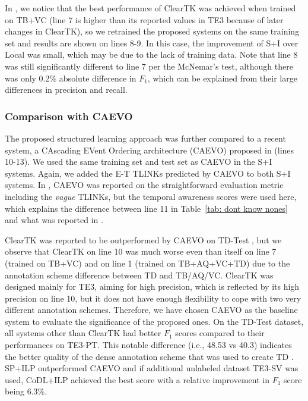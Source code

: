 \documentclass[11pt,letterpaper]{article}
\newcommand{\final}[1]{#1}
\begin{document}
{In \citet{uzzaman2013TE3}, we notice that the best performance of ClearTK was achieved when trained on TB+VC (line 7 is higher than its reported values in TE3 because of later changes in ClearTK), so we retrained the proposed systems on the same training set and results are shown on lines 8-9.
In this case, the improvement of S+I over Local was small, which may be due to the lack of training data. Note that line 8 was still significantly different to line 7 per the McNemar's test, although there was only 0.2\% absolute difference in $F_1$, which can be explained from their large differences in precision and recall.

\subsubsection{\final{Comparison with CAEVO}}
The proposed structured learning approach was further compared to a recent system, a CAscading EVent Ordering architecture (CAEVO) proposed in \citet{chambers2014dense} (lines 10-13).
We used the same training set and test set as CAEVO in the S+I systems. Again, we added the E-T TLINKs predicted by CAEVO to both S+I systems.
In \citet{chambers2014dense}, CAEVO was reported on the straightforward evaluation metric including the {\em vague} TLINKs, but the temporal awareness scores were used here, which explains the difference between line 11 \final{in Table~\ref{tab: dont know nones}} and \final{what was reported in} \citet{chambers2014dense}.

ClearTK was reported to be outperformed by CAEVO on TD-Test \citep{chambers2014dense}, but we observe that ClearTK on line 10 was much worse even than itself \final{on line 7 (trained on TB+VC) and on line 1 (trained on TB+AQ+VC+TD)} due to the annotation scheme difference between TD and TB/AQ/VC. 
\final{ClearTK was designed mainly for TE3, aiming for high precision, which is reflected by its high precision on line 10, but it does not have enough flexibility to cope with two very different annotation schemes.}
Therefore, we have chosen CAEVO as the baseline system to evaluate the significance of the proposed ones.
On the TD-Test dataset, all systems other than ClearTK had better $F_1$ scores compared to their performances on TE3-PT. This notable difference (i.e., 48.53 vs 40.3) indicates the better quality of the dense annotation scheme that was used to create TD \citep{cassidy2014annotation}.
SP+ILP outperformed CAEVO and if additional unlabeled dataset TE3-SV was used, CoDL+ILP achieved the best score with a relative improvement in $F_1$ score being 6.3\%.

}
\end{document}
